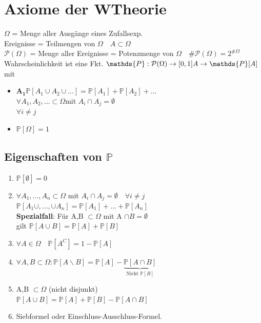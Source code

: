 \chapter{Axiome der WTheorie}
$\Omega$ = Menge aller Ausgänge eines Zufallsexp.\\
Ereignisse = Teilmengen von $\Omega \quad A \subset \Omega$\\
$\mathcal{P}(\Omega)$ = Menge aller Ereignisse = Potenzmenge von $\Omega \quad \#\mathcal{P}(\Omega)=2^{\#\Omega}$\\
Wahrscheinlichkeit ist eine Fkt. $\mathds{P}:\mathcal{P}(\Omega) \rightarrow [0,1] \\ A \rightarrow \mathds{P}[A] $ mit 
\begin{itemize}
	\item $\mathbf{A_1} \mathds{P}[A_1\cup A_2\cup...]=\mathds{P}[A_1]+\mathds{P}[A_2]+...$\\
	$\forall A_1, A_2,... \subset \Omega $mit $A_i \cap A_j = \emptyset$\\$\forall i \neq j$
	\item $\mathds{P}[\Omega]=1$
\end{itemize}
\section{Eigenschaften von $\mathds{P}$}
\begin{enumerate}
	\item $\mathds{P}[\emptyset]=0$
	\item $\forall A_1,...,A_n \subset \Omega $ mit $A_i \cap A_j = \emptyset \quad \forall i \neq j$\\
	$\mathds{P}[A_1\cup,...,\cup A_n] = \mathds{P}[A_1]+...+\mathds{P}[A_n]$\medskip\\
	\textbf{Spezialfall}: Für A,B $\subset \Omega$ mit A $\cap B = \emptyset$\\gilt 
	$\mathds{P}[A\cup B] = \mathds{P}[A] + \mathds{P}[B]$
	\item $\forall A \in \Omega \quad \mathds{P}[A^C]=1-\mathds{P}[A]$
	\item $\forall A, B \subset \Omega : \mathds{P}[A\backslash B] =\mathds{P}[A]-\underbrace{\mathds{P}[A\cap B]}_{\text{Nicht }\mathds{P}[B]}$
	\item A,B $\subset \Omega$ (nicht disjunkt)\\
	$\mathds{P}[A\cup B] = \mathds{P}[A] + \mathds{P}[B] - \mathds{P}[A\cap B]$
	\item Siebformel oder Einschluss-Ausschluss-Formel.\\
	\end{enumerate}

